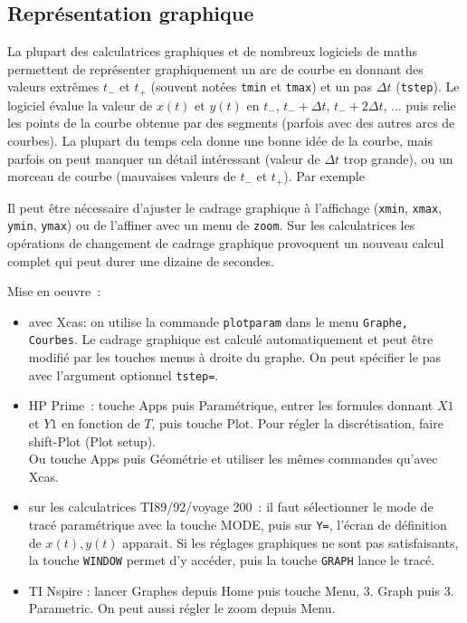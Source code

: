 \documentclass[a4paper,11pt]{book}
\begin{document}
\begin{giacjshere}
\section{Repr\'esentation graphique} 
La plupart des calculatrices graphiques
et de nombreux logiciels de maths permettent de
repr\'esenter graphiquement un arc de courbe en donnant des valeurs
extr\^emes $t_-$ et $t_+$ (souvent not\'ees \verb|tmin| et
\verb|tmax|) et un pas $\Delta t$ (\verb|tstep|). Le logiciel \'evalue
la valeur de $x(t)$ et $y(t)$ en $t_-$, $t_-+\Delta t$, $t_-+2\Delta
t$, ... puis relie les points de la courbe obtenue par des segments
(parfois avec des autres arcs de courbes). La plupart du temps
cela donne une bonne id\'ee de la courbe, mais parfois on peut
manquer un d\'etail int\'eressant (valeur de $\Delta t$ trop
grande), ou un morceau de courbe (mauvaises
valeurs de $t_-$ et $t_+$). Par exemple 

Il peut \^etre n\'ecessaire d'ajuster le cadrage graphique
\`a l'affichage (\verb|xmin|, \verb|xmax|, \verb|ymin|, \verb|ymax|) ou
de l'affiner avec un menu de \verb|zoom|. Sur les calculatrices
les op\'erations de changement de cadrage graphique
provoquent un nouveau calcul complet qui peut durer une
dizaine de secondes.

Mise en oeuvre~:
\begin{itemize}
\item avec Xcas: on utilise la commande \verb|plotparam|
dans le menu \verb|Graphe, Courbes|. Le cadrage
graphique est calcul\'e automatiquement et peut \^etre
modifi\'e par les touches menus \`a droite du graphe.
On peut sp\'ecifier le pas avec l'argument optionnel \verb|tstep=|.
\item HP Prime~: touche Apps puis Param\'etrique, entrer les
formules donnant $X1$ et $Y1$ en fonction de $T$, puis touche
Plot. Pour r\'egler la discr\'etisation, faire shift-Plot (Plot
setup).\\
Ou touche Apps puis G\'eom\'etrie et utiliser les m\^emes commandes 
qu'avec Xcas.
\item sur les calculatrices TI89/92/voyage 200~: il faut s\'electionner le mode
de trac\'e param\'etrique avec la touche MODE,
puis sur \verb|Y=|, l'\'ecran de d\'efinition
de $x(t),y(t)$ apparait. Si les r\'eglages graphiques
ne sont pas satisfaisants, la touche \verb|WINDOW|
permet d'y acc\'eder, puis la touche \verb|GRAPH| lance
le trac\'e.
\item TI Nspire : lancer Graphes depuis Home puis touche Menu,
3. Graph puis 3. Parametric. On peut aussi r\'egler le zoom depuis Menu.
\end{itemize}


\end{giacjshere}
\end{document}

